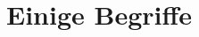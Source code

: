 \documentclass[a4paper, 10pt]{scrartcl}
\begin{document}
\tableofcontents
\newpage

\section{Einige Begriffe}
\end{document}
